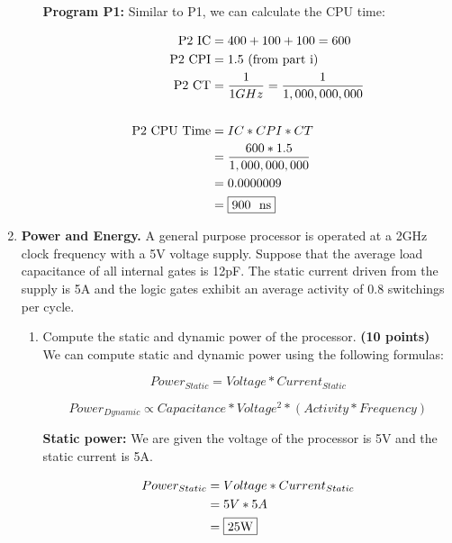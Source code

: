 \documentclass[a4paper, 15pt]{exam}
\begin{document}
\begin{enumerate}
\begin{enumerate}
\textbf{Program P1:} Similar to P1, we can calculate the CPU time:

\begin{align*} 
   			\text{P2 IC} &= 400 + 100 + 100 = 600 \\
   			\text{P2 CPI} &= 1.5 \text{ (from part i)} \\
   			\text{P2 CT} &= \frac{1}{1 GHz} = \frac{1}{1,000,000,000} \\ \\
   			\text{P2 CPU Time} &= IC * CPI * CT \\
   			&= \frac{600 * 1.5}{1,000,000,000} \\
   			&= 0.0000009 \\
   			&= \fbox{900 \ ns}
   	\end{align*}

\end{enumerate}
    \item \textbf{Power and Energy.} A general purpose processor is operated at a 2GHz clock frequency with a 5V voltage supply. Suppose that the average load capacitance of all internal gates is 12pF. The static current driven from the supply is 5A and the logic gates exhibit an average activity of 0.8 switchings per cycle.
    \begin{enumerate}
    \item Compute the static and dynamic power of the processor. \textbf{(10 points)} \\
  We can compute static and dynamic power using the following formulas:
  
  $$Power_{Static} = Voltage * Current_{Static}$$
  
  $$Power_{Dynamic} \propto Capacitance * Voltage^2 * (Activity * Frequency)$$
  
  \textbf{Static power:} We are given the voltage of the processor is 5V and the static current is 5A.
  
  \begin{align*} 
   			Power_{Static} &= Voltage * Current_{Static} \\
   			&= 5V * 5A \\
   			&= \fbox{25W}
   	\end{align*}


\end{enumerate}
\end{enumerate}
\end{document}
